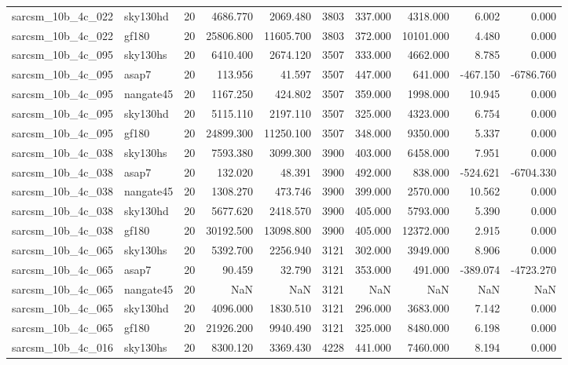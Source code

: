 \begin{longtable}{llrrrrrrrr}
sarcsm\_10b\_4c\_022 & sky130hd & 20 & 4686.770 & 2069.480 & 3803 & 337.000 & 4318.000 & 6.002 & 0.000 \\
sarcsm\_10b\_4c\_022 & gf180 & 20 & 25806.800 & 11605.700 & 3803 & 372.000 & 10101.000 & 4.480 & 0.000 \\
sarcsm\_10b\_4c\_095 & sky130hs & 20 & 6410.400 & 2674.120 & 3507 & 333.000 & 4662.000 & 8.785 & 0.000 \\
sarcsm\_10b\_4c\_095 & asap7 & 20 & 113.956 & 41.597 & 3507 & 447.000 & 641.000 & -467.150 & -6786.760 \\
sarcsm\_10b\_4c\_095 & nangate45 & 20 & 1167.250 & 424.802 & 3507 & 359.000 & 1998.000 & 10.945 & 0.000 \\
sarcsm\_10b\_4c\_095 & sky130hd & 20 & 5115.110 & 2197.110 & 3507 & 325.000 & 4323.000 & 6.754 & 0.000 \\
sarcsm\_10b\_4c\_095 & gf180 & 20 & 24899.300 & 11250.100 & 3507 & 348.000 & 9350.000 & 5.337 & 0.000 \\
sarcsm\_10b\_4c\_038 & sky130hs & 20 & 7593.380 & 3099.300 & 3900 & 403.000 & 6458.000 & 7.951 & 0.000 \\
sarcsm\_10b\_4c\_038 & asap7 & 20 & 132.020 & 48.391 & 3900 & 492.000 & 838.000 & -524.621 & -6704.330 \\
sarcsm\_10b\_4c\_038 & nangate45 & 20 & 1308.270 & 473.746 & 3900 & 399.000 & 2570.000 & 10.562 & 0.000 \\
sarcsm\_10b\_4c\_038 & sky130hd & 20 & 5677.620 & 2418.570 & 3900 & 405.000 & 5793.000 & 5.390 & 0.000 \\
sarcsm\_10b\_4c\_038 & gf180 & 20 & 30192.500 & 13098.800 & 3900 & 405.000 & 12372.000 & 2.915 & 0.000 \\
sarcsm\_10b\_4c\_065 & sky130hs & 20 & 5392.700 & 2256.940 & 3121 & 302.000 & 3949.000 & 8.906 & 0.000 \\
sarcsm\_10b\_4c\_065 & asap7 & 20 & 90.459 & 32.790 & 3121 & 353.000 & 491.000 & -389.074 & -4723.270 \\
sarcsm\_10b\_4c\_065 & nangate45 & 20 & NaN & NaN & 3121 & NaN & NaN & NaN & NaN \\
sarcsm\_10b\_4c\_065 & sky130hd & 20 & 4096.000 & 1830.510 & 3121 & 296.000 & 3683.000 & 7.142 & 0.000 \\
sarcsm\_10b\_4c\_065 & gf180 & 20 & 21926.200 & 9940.490 & 3121 & 325.000 & 8480.000 & 6.198 & 0.000 \\
sarcsm\_10b\_4c\_016 & sky130hs & 20 & 8300.120 & 3369.430 & 4228 & 441.000 & 7460.000 & 8.194 & 0.000 \\

\end{longtable}
